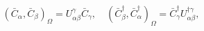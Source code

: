 \begin{equation}\label{5.21}
(\bar{C}_\alpha,\bar{C}_\beta)_\Omega=
U^\gamma_{\alpha\beta}\bar{C}_\gamma,\quad
(\bar{C}^\dagger_\beta,\bar{C}^\dagger_\alpha)_\Omega=
\bar{C}^\dagger_\gamma U^{\dagger\gamma}_{\alpha\beta},
\end{equation}

